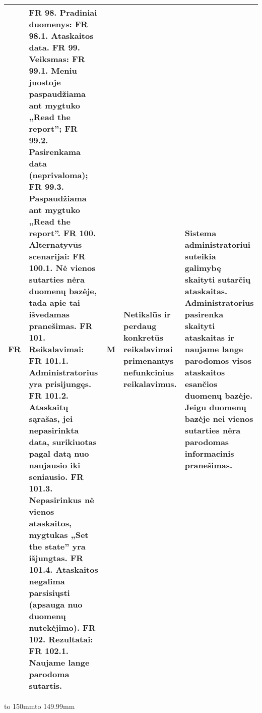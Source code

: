 \documentclass[oneside]{VUMIFPSkursinis}
\begin{document}
\begin{longtable}{ | p{}|p{}|p{}|p{}|p{}| }  \hline

FR & 
FR 98. Pradiniai duomenys: 
FR 98.1. Ataskaitos data. 
FR 99. Veiksmas:
 FR 99.1. Meniu juostoje paspaudžiama ant mygtuko „Read the report”;
 FR 99.2. Pasirenkama data (neprivaloma);
 FR 99.3. Paspaudžiama ant mygtuko „Read the report”. 
FR 100. Alternatyvūs scenarijai:
FR 100.1. Nė vienos sutarties nėra duomenų bazėje, tada apie tai išvedamas 
pranešimas. 
FR 101. Reikalavimai: 
FR 101.1. Administratorius yra prisijungęs.
 FR 101.2. Ataskaitų sąrašas, jei nepasirinkta data, surikiuotas pagal datą nuo naujausio iki seniausio.
 FR 101.3. Nepasirinkus nė vienos ataskaitos, mygtukas „Set the state” yra išjungtas. 
FR 101.4. Ataskaitos negalima parsisiųsti (apsauga nuo duomenų nutekėjimo). 
FR 102. Rezultatai:
 FR 102.1. Naujame lange parodoma sutartis. 
& M & Netikslūs ir perdaug konkretūs reikalavimai primenantys nefunkcinius reikalavimus. &
Sistema administratoriui suteikia galimybę skaityti sutarčių ataskaitas. Administratorius pasirenka skaityti ataskaitas ir naujame lange parodomos visos ataskaitos esančios duomenų bazėje. Jeigu duomenų bazėje nei vienos sutarties nėra parodomas informacinis pranešimas. \\ \hline


\end{longtable}
	

\hbox to 150mm{\hbox to 149.99mm{}}

\end{document}
